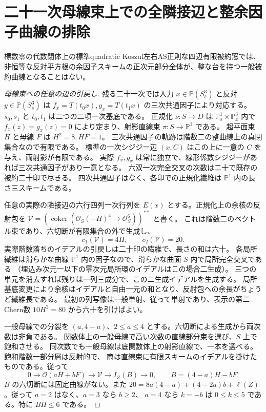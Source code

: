\section{二十一次母線束上での全隣接辺と整余因子曲線の排除}
\label{sec:bezout-scroll-neighbors}
\begin{theorem}\label{thm:exclude-integral-cofactor-curves}
標数零の代数閉体上の標準quadratic Koszul左右AS正則な四辺有限被約窓では、
非恒等な反対平方根の余因子スキームの正次元部分全体が、整な台を持つ一般被約曲線となることはない。
\end{theorem}
\begin{proof}[母線束への任意の辺の引戻し]
残る二十一次では入力 $x\in\mathbb P(S_t^3)$ と反対 $y\in\mathbb P(S_s^3)$ は
$f_x=T(t_0x),g_x=T(t_1x)$ の三次共通因子により対応する。
$s_0,s_1$ と $t_0,t_1$ は二つの二項一次基底である。
正規化 $\nu:S\to D$ は $\mathbb P^1_s\times\mathbb P^3_x$ 内で
$f_x(z)=g_x(z)=0$ により定まり、射影直線束 $\pi:S\to\mathbb P^1$ である。
超平面束 $H$ と母線 $F$ は $H^2=8,HF=1$。
三次共通因子の軌跡は階数二の整曲線上の真閉集合なので有限である。
標準の一次シジジー辺 $(x,C)$ はこの上に一意の $C$ を与え、両射影が有限である。
実際 $f_x,g_x$ は常に独立で、線形係数シジジーがあれば三次共通因子があり一意となる。
六双一次完全交叉の次数は二十で既存の被約二十印で尽きる。
四次共通因子はなく、各印での正規化繊維は $\mathbb P^1$ 内の長さ三スキームである。

任意の実際の隣接辺の六行四列一次行列を $E(x)$ とする。正規化上の余核の反射包を
$\mathcal V=(\operatorname{coker}(\mathcal O_S(-H)^4\to\mathcal O_S^6))^{**}$ と書く。
これは階数二のベクトル束であり、六切断が有限集合の外で生成し、
\[
                       c_1(\mathcal V)=4H,\qquad c_2(\mathcal V)=20 .
\]
実際階数落ちのイデアルの引戻しは二十印の繊維で、長さの和は六十。
各局所繊維は滑らかな曲線 $\mathbb P^1$ 内の因子なので、滑らかな曲面 $S$ 内で局所完全交叉である
（埋込み次元一以下の零次元局所環のイデアルはこの場合二生成）。
三つの単元を消去すれば残りは一列三成分で、この二生成イデアルを生成する。
局所基底変更により余核はイデアルと自由一元の和となり、反射包への余長がちょうど繊維長である。
最初の列写像は一般単射、従って単射であり、表示の第二Chern数 $10H^2=80$ から六十を引けばよい。

一般母線での分裂を $(a,4-a)$、$2\le a\le4$ とする。六切断による生成から両次数は非負である。
関数体上の一般母線で高い次数の直線部分束を選び、$S$ 上で飽和させる。
同次数でも一般母線は底関数体上の射影直線で、一本を選べる。飽和階数一部分層は反射的で、
商は直線束に有限スキームのイデアルを掛けたものである。従って
\[
 0\longrightarrow\mathcal O(aH+bF)\longrightarrow\mathcal V
   \longrightarrow I_Z(B)\longrightarrow0,\qquad B=(4-a)H-bF .
\]
$B$ の六切断には固定曲線がない。また
$20=8a(4-a)+(4-2a)b+\ell(Z)$。従って $a=2$ はなく、$a=3$ なら $b\ge2$、
$a=4$ なら $k=-b$ は $0\le k\le5$ である。特に $BH\le6$ である。
\end{proof}

